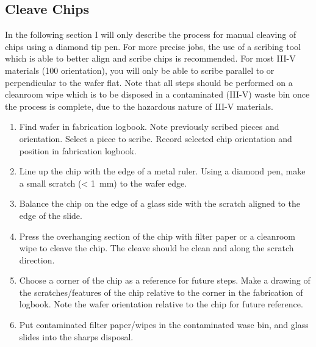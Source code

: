 \subsection{Cleave Chips}
\label{sec:cleave}
In the following section I will only describe the process for manual cleaving of chips using a diamond tip pen.
For more precise jobs, the use of a scribing tool which is able to better align and scribe chips is recommended.
For most III-V materials (100 orientation), you will only be able to scribe parallel to or perpendicular to the wafer flat.
Note that all steps should be performed on a cleanroom wipe which is to be disposed in a contaminated (III-V) waste bin
once the process is complete, due to the hazardous nature of III-V materials.
\begin{enumerate}
    \item Find wafer in fabrication logbook. Note previously scribed pieces and orientation. Select a piece to scribe. Record selected chip orientation and position in fabrication logbook.
    \item Line up the chip with the edge of a metal ruler. Using a diamond pen, make a small scratch (< \SI{1}{\milli\meter}) to the wafer edge.
    \item Balance the chip on the edge of a glass side with the scratch aligned to the edge of the slide.
    \item Press the overhanging section of the chip with filter paper or a cleanroom wipe to cleave the chip. The cleave should be clean and along the scratch direction.
    \item Choose a corner of the chip as a reference for future steps. Make a drawing of the scratches/features of the chip relative to the corner in the fabrication of logbook. Note the wafer orientation relative to the chip for future reference.
    \item Put contaminated filter paper/wipes in the contaminated wase bin, and glass slides into the sharps disposal.
\end{enumerate}

